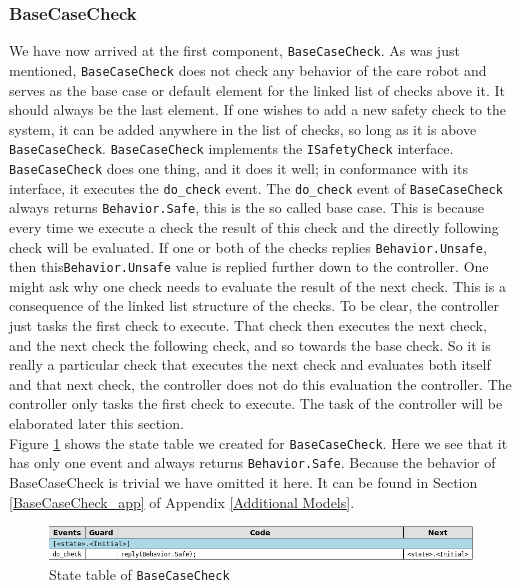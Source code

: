 \documentclass[12pt]{scrreprt}
\begin{document}
\subsubsection{BaseCaseCheck}
We have now arrived at the first component, \texttt{BaseCaseCheck}. As was just mentioned, \texttt{BaseCaseCheck} does not check any behavior of the care robot and serves as the base case or default element for the linked list of checks above it. It should always be the last element. If one wishes to add a new safety check to the system, it can be added anywhere in the list of checks, so long as it is above \texttt{BaseCaseCheck}. \texttt{BaseCaseCheck} implements the \texttt{ISafetyCheck} interface. \texttt{BaseCaseCheck} does one thing, and it does it well; in conformance with its interface, it executes the \texttt{do\_check} event. The \texttt{do\_check} event of \texttt{BaseCaseCheck} always returns \texttt{Behavior.Safe}, this is the so called base case. This is because every time we execute a check the result of this check and the directly following check will be evaluated. If one or both of the checks replies \texttt{Behavior.Unsafe}, then this\texttt{Behavior.Unsafe} value is replied further down to the controller. One might ask why one check needs to evaluate the result of the next check. This is a consequence of the linked list structure of the checks. To be clear, the controller just tasks the first check to execute. That check then executes the next check, and the next check the following check, and so towards the base check. So it is really a particular check that executes the next check and evaluates both itself and that next check, the controller does not do this evaluation the controller. The controller only tasks the first check to execute. The task of the controller will be elaborated later this section. 
\\
Figure \ref{fig:basecasechekc_state_table} shows the state table we created for \texttt{BaseCaseCheck}. Here we see that it has only one event and always returns \texttt{Behavior.Safe}. Because the behavior of BaseCaseCheck is trivial we have omitted it here. It can be found in Section \ref{BaseCaseCheck_app} of Appendix \ref{Additional Models}.

\begin{figure}[H]
    \centering
    \includegraphics[width=\textwidth]{Figures/results/modelling_figures/BaseCaseCheck/BaseCaseCheck_state_table.png}
    \caption{State table of \texttt{BaseCaseCheck}}
    \label{fig:basecasechekc_state_table}
\end{figure}
\end{document}

